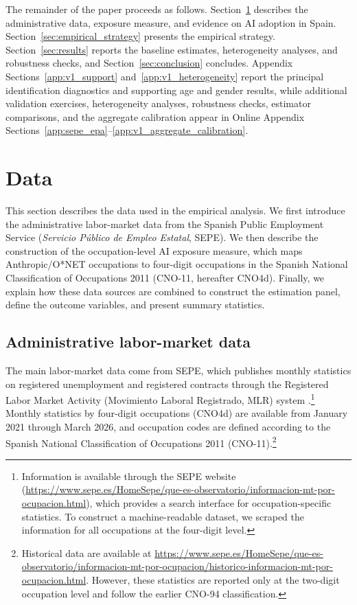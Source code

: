 The remainder of the paper proceeds as follows. Section~\ref{sec:data} describes the administrative data, exposure measure, and evidence on AI adoption in Spain. Section~\ref{sec:empirical_strategy} presents the empirical strategy. Section~\ref{sec:results} reports the baseline estimates, heterogeneity analyses, and robustness checks, and Section~\ref{sec:conclusion} concludes. Appendix Sections~\ref{app:v1_support} and~\ref{app:v1_heterogeneity} report the principal identification diagnostics and supporting age and gender results, while additional validation exercises, heterogeneity analyses, robustness checks, estimator comparisons, and the aggregate calibration appear in Online Appendix Sections~\ref{app:sepe_epa}--\ref{app:v1_aggregate_calibration}.

\section{Data}
\label{sec:data}

This section describes the data used in the empirical analysis. We first introduce the administrative labor-market data from the Spanish Public Employment Service (\textit{Servicio P\'ublico de Empleo Estatal}, SEPE). We then describe the construction of the occupation-level AI exposure measure, which maps Anthropic/O*NET occupations to four-digit occupations in the Spanish National Classification of Occupations 2011 (CNO-11, hereafter CNO4d). Finally, we explain how these data sources are combined to construct the estimation panel, define the outcome variables, and present summary statistics.


\subsection{Administrative labor-market data}

The main labor-market data come from SEPE, which publishes monthly statistics on registered unemployment and registered contracts through the Registered Labor Market Activity (Movimiento Laboral Registrado, MLR) system \citep{sepe_stats}.\footnote{Information is available through the SEPE website (\url{https://www.sepe.es/HomeSepe/que-es-observatorio/informacion-mt-por-ocupacion.html}), which provides a search interface for occupation-specific statistics. To construct a machine-readable dataset, we scraped the information for all occupations at the four-digit level.} Monthly statistics by four-digit occupations (CNO4d) are available from January 2021 through March 2026, and occupation codes are defined according to the Spanish National Classification of Occupations 2011 (CNO-11).\footnote{Historical data are available at \url{https://www.sepe.es/HomeSepe/que-es-observatorio/informacion-mt-por-ocupacion/historico-informacion-mt-por-ocupacion.html}. However, these statistics are reported only at the two-digit occupation level and follow the earlier CNO-94 classification.} %

